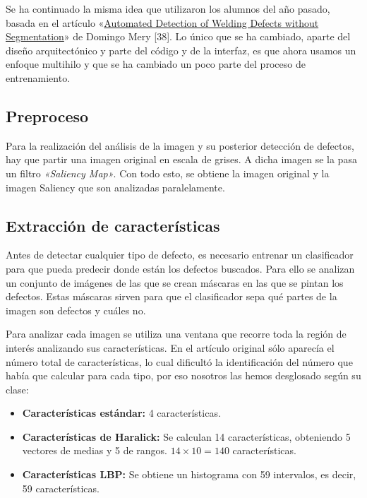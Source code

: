 Se ha continuado la misma idea que utilizaron los alumnos del año pasado, basada en el artículo «\underline{Automated Detection of Welding Defects without Segmentation}» de Domingo Mery [38]. Lo único que se ha cambiado, aparte del diseño arquitectónico y parte del código y de la interfaz, es que ahora usamos un enfoque multihilo y que se ha cambiado un poco parte del proceso de entrenamiento.

\subsection{Preproceso}
Para la realización del análisis de la imagen y su posterior detección de defectos, hay que partir una imagen original en escala de grises. A dicha imagen se la pasa un filtro \textit{«Saliency Map»}. Con todo esto, se obtiene la imagen original y la imagen Saliency que son analizadas paralelamente.


\subsection{Extracción de características}
Antes de detectar cualquier tipo de defecto, es necesario entrenar un clasificador para que pueda predecir donde están los defectos buscados. Para ello se analizan un conjunto de imágenes de las que se crean máscaras en las que se pintan los defectos. Estas máscaras sirven para que el clasificador sepa qué partes de la imagen son defectos y cuáles no.

Para analizar cada imagen se utiliza una ventana que recorre toda la región de interés analizando sus características. En el artículo original sólo aparecía el número total de características, lo cual dificultó la identificación del número que había que calcular para cada tipo, por eso nosotros las hemos desglosado según su clase:

\begin{itemize}
\item \textbf{Características estándar:} 4 características.
\item \textbf{Características de Haralick:} Se calculan 14 características, obteniendo 5 vectores de medias
y 5 de rangos. $14 \times 10 = 140$ características.
\item \textbf{Características LBP:} Se obtiene un histograma con 59 intervalos, es decir, 59 características.
\end{itemize}

